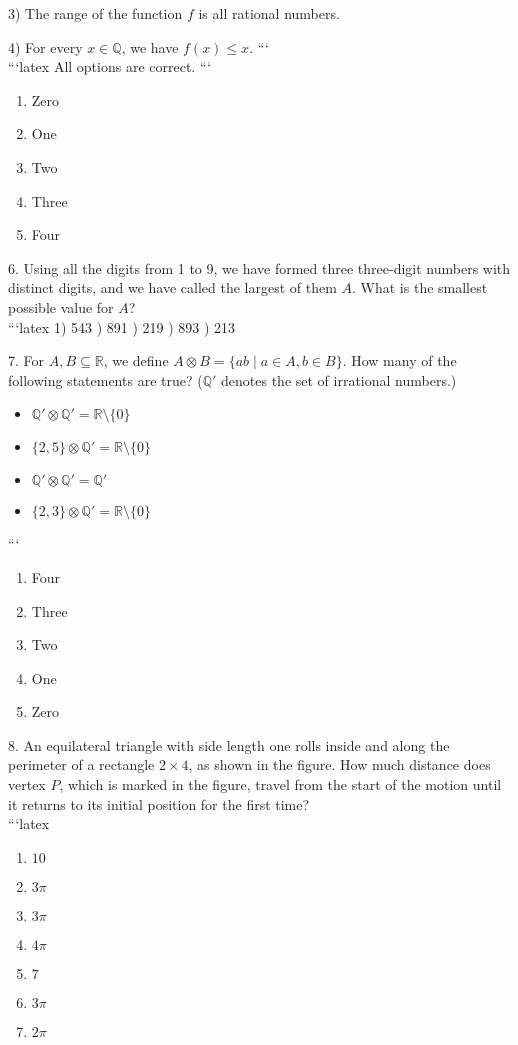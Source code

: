 3) The range of the function $f$ is all rational numbers. 

4) For every $x \in \mathbb{Q}$, we have $f(x) \leq x$.
```
\\
```latex
All options are correct.
```
\\
\begin{enumerate}
    \item Zero
    \item One
    \item Two
    \item Three
    \item Four
\end{enumerate}

6. Using all the digits from 1 to 9, we have formed three three-digit numbers with distinct digits, and we have called the largest of them $A$. What is the smallest possible value for $A$?
\\
```latex
1) 543 ) 891 ) 219 ) 893 ) 213

7. For \( A, B \subseteq \mathbb{R} \), we define \( A \otimes B = \{ ab \mid a \in A, b \in B \} \). How many of the following statements are true? (\( \mathbb{Q}' \) denotes the set of irrational numbers.)
\begin{itemize}
    \item \( \mathbb{Q}' \otimes \mathbb{Q}' = \mathbb{R} \setminus \{ 0 \} \)
    \item \( \{ 2, 5 \} \otimes \mathbb{Q}' = \mathbb{R} \setminus \{ 0 \} \)
    \item \( \mathbb{Q}' \otimes \mathbb{Q}' = \mathbb{Q}' \)
    \item \( \{ 2, 3 \} \otimes \mathbb{Q}' = \mathbb{R} \setminus \{ 0 \} \)
\end{itemize}
```
\\
\begin{enumerate}
    \item Four
    \item Three
    \item Two
    \item One
    \item Zero
\end{enumerate}

8. An equilateral triangle with side length one rolls inside and along the perimeter of a rectangle $2 \times 4$, as shown in the figure. How much distance does vertex $P$, which is marked in the figure, travel from the start of the motion until it returns to its initial position for the first time?
\\
```latex
\begin{enumerate}
    \item $10$
    \item $3\pi$
    \item $3\pi$
    \item $4\pi$
    \item $7$
    \item $3\pi$
    \item $2\pi$
\end{enumerate}

